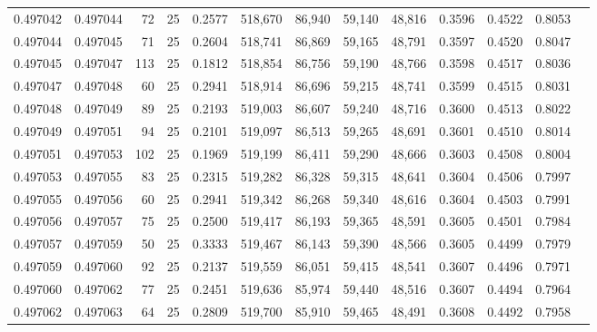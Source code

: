 \begin{tabular}{rrrrrrrrrrrrr}
0.497042 & 0.497044 &    72 &  25 &                                     0.2577 & 518,670 &  86,940 &  59,140 &  48,816 & 0.3596 & 0.4522 & 0.8053 \\
0.497044 & 0.497045 &    71 &  25 &                                     0.2604 & 518,741 &  86,869 &  59,165 &  48,791 & 0.3597 & 0.4520 & 0.8047 \\
0.497045 & 0.497047 &   113 &  25 &                                     0.1812 & 518,854 &  86,756 &  59,190 &  48,766 & 0.3598 & 0.4517 & 0.8036 \\
0.497047 & 0.497048 &    60 &  25 &                                     0.2941 & 518,914 &  86,696 &  59,215 &  48,741 & 0.3599 & 0.4515 & 0.8031 \\
0.497048 & 0.497049 &    89 &  25 &                                     0.2193 & 519,003 &  86,607 &  59,240 &  48,716 & 0.3600 & 0.4513 & 0.8022 \\
0.497049 & 0.497051 &    94 &  25 &                                     0.2101 & 519,097 &  86,513 &  59,265 &  48,691 & 0.3601 & 0.4510 & 0.8014 \\
0.497051 & 0.497053 &   102 &  25 &                                     0.1969 & 519,199 &  86,411 &  59,290 &  48,666 & 0.3603 & 0.4508 & 0.8004 \\
0.497053 & 0.497055 &    83 &  25 &                                     0.2315 & 519,282 &  86,328 &  59,315 &  48,641 & 0.3604 & 0.4506 & 0.7997 \\
0.497055 & 0.497056 &    60 &  25 &                                     0.2941 & 519,342 &  86,268 &  59,340 &  48,616 & 0.3604 & 0.4503 & 0.7991 \\
0.497056 & 0.497057 &    75 &  25 &                                     0.2500 & 519,417 &  86,193 &  59,365 &  48,591 & 0.3605 & 0.4501 & 0.7984 \\
0.497057 & 0.497059 &    50 &  25 &                                     0.3333 & 519,467 &  86,143 &  59,390 &  48,566 & 0.3605 & 0.4499 & 0.7979 \\
0.497059 & 0.497060 &    92 &  25 &                                     0.2137 & 519,559 &  86,051 &  59,415 &  48,541 & 0.3607 & 0.4496 & 0.7971 \\
0.497060 & 0.497062 &    77 &  25 &                                     0.2451 & 519,636 &  85,974 &  59,440 &  48,516 & 0.3607 & 0.4494 & 0.7964 \\
0.497062 & 0.497063 &    64 &  25 &                                     0.2809 & 519,700 &  85,910 &  59,465 &  48,491 & 0.3608 & 0.4492 & 0.7958 \\

\end{tabular}
